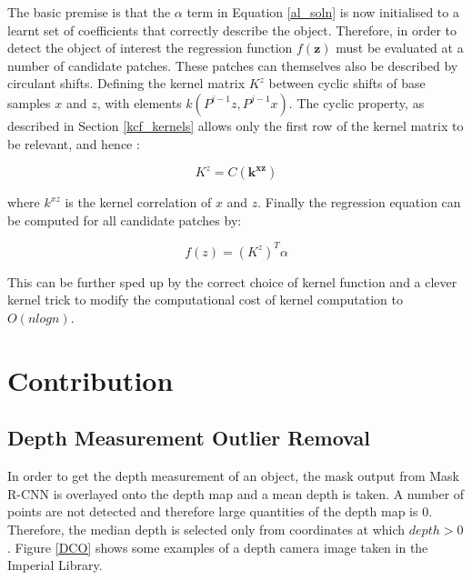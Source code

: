 \documentclass[11pt,twoside]{report}
\begin{document}
The basic premise is that the $\alpha$ term in Equation \ref{al_soln} is now initialised to a learnt set of coefficients that correctly describe the object. Therefore, in order to detect the object of interest the regression function $f(\mathbf{z})$ must be evaluated at a number of candidate patches.  These patches can themselves also be described by circulant shifts. Defining the kernel matrix $K^{z}$ between cyclic shifts of base samples $x$ and $z$, with elements $k(P^{i-1}z,P^{j-1}x)$. The cyclic property, as described in Section \ref{kcf_kernels} allows only the first row of the kernel matrix to be relevant, and hence :

\begin{equation}
K^{z} = C(\mathbf{k^{xz}})
\end{equation}

where $k^{xz}$ is the kernel correlation of $x$ and $z$. Finally the regression equation can be computed for all candidate patches by:

\begin{equation}
f(z) = (K^{z})^{T} \alpha
\end{equation}

This can be further sped up by the correct choice of kernel function and a clever kernel trick to modify the computational cost of kernel computation to $O(nlogn)$. 

\chapter{Contribution}

\section{Depth Measurement Outlier Removal}

In order to get the depth measurement of an object, the mask output from Mask R-CNN is overlayed onto the depth map and a mean depth is taken. A number of points are not detected and therefore large quantities of the depth map is 0. Therefore, the median depth is selected only from coordinates at which $depth>0$. Figure \ref{DCO} shows some examples of a depth camera image taken in the Imperial Library.
\end{document}
